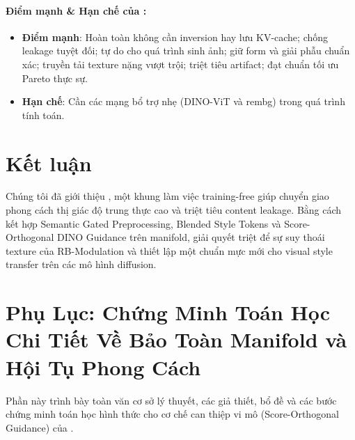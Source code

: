 \documentclass[runningheads]{llncs}
\begin{document}
\paragraph{Điểm mạnh \& Hạn chế của \method:}
\begin{itemize}
    \item \textbf{Điểm mạnh}: Hoàn toàn không cần inversion hay lưu KV-cache; chống leakage tuyệt đối; tự do cho quá trình sinh ảnh; giữ form và giải phẫu chuẩn xác; truyền tải texture nặng vượt trội; triệt tiêu artifact; đạt chuẩn tối ưu Pareto thực sự.
    \item \textbf{Hạn chế}: Cần các mạng bổ trợ nhẹ (DINO-ViT và rembg) trong quá trình tính toán.
\end{itemize}

\section{Kết luận}
\label{sec:conclusion}

Chúng tôi đã giới thiệu \textbf{\method}, một khung làm việc training-free giúp chuyển giao phong cách thị giác độ trung thực cao và triệt tiêu content leakage. Bằng cách kết hợp Semantic Gated Preprocessing, Blended Style Tokens và Score-Orthogonal DINO Guidance trên manifold, \method giải quyết triệt để sự suy thoái texture của RB-Modulation và thiết lập một chuẩn mực mới cho visual style transfer trên các mô hình diffusion.




\clearpage
\appendix
\section*{Phụ Lục: Chứng Minh Toán Học Chi Tiết Về Bảo Toàn Manifold và Hội Tụ Phong Cách}
\label{sec:appendix_proof}

Phần này trình bày toàn văn cơ sở lý thuyết, các giả thiết, bổ đề và các bước chứng minh toán học hình thức cho cơ chế can thiệp vi mô (Score-Orthogonal Guidance) của \method.
\end{document}
